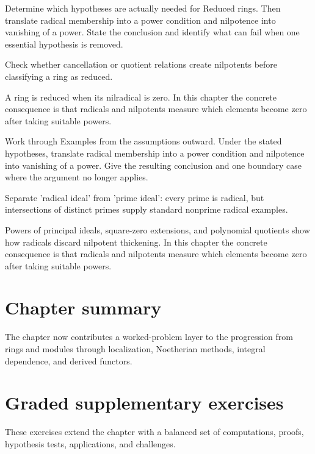 \begin{exercise}\label{exr:v03-07}
Determine which hypotheses are actually needed for Reduced rings. Then translate radical membership into a power condition and nilpotence into vanishing of a power. State the conclusion and identify what can fail when one essential hypothesis is removed.
\end{exercise}
\begin{hint}
Check whether cancellation or quotient relations create nilpotents before classifying a ring as reduced.
\end{hint}
\begin{solution}
A ring is reduced when its nilradical is zero. In this chapter the concrete consequence is that radicals and nilpotents measure which elements become zero after taking suitable powers.
\end{solution}

\begin{exercise}\label{exr:v03-08}
Work through Examples from the assumptions outward. Under the stated hypotheses, translate radical membership into a power condition and nilpotence into vanishing of a power. Give the resulting conclusion and one boundary case where the argument no longer applies.
\end{exercise}
\begin{hint}
Separate 'radical ideal' from 'prime ideal': every prime is radical, but intersections of distinct primes supply standard nonprime radical examples.
\end{hint}
\begin{solution}
Powers of principal ideals, square-zero extensions, and polynomial quotients show how radicals discard nilpotent thickening. In this chapter the concrete consequence is that radicals and nilpotents measure which elements become zero after taking suitable powers.
\end{solution}

\section*{Chapter summary}
The chapter now contributes a worked-problem layer to the progression from rings and modules through localization, Noetherian methods, integral dependence, and derived functors.
\section{Graded supplementary exercises}
These exercises extend the chapter with a balanced set of computations, proofs, hypothesis tests, applications, and challenges.

